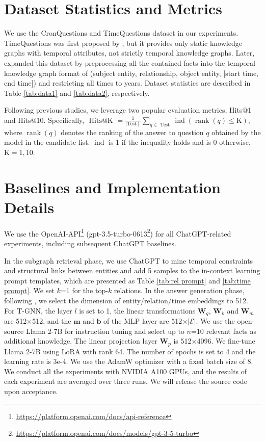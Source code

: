\documentclass[11pt]{article}
\begin{document}
\section{Dataset Statistics and Metrics}
\label{appendix:dataset}

We use the CronQuestions and TimeQuestions dataset in our experiments. TimeQuestions was first proposed by \citet{TimeQuestions}, but it provides only static knowledge graphs with temporal attributes, not strictly temporal knowledge graphs. Later, \citet{TwiRGCN} expanded this dataset by preprocessing all the contained facts into the temporal knowledge graph format of (subject entity, relationship, object entity, [start time, end time]) and restricting all times to years. Dataset statistics are described in Table \ref{tab:data1} and \ref{tab:data2}, respectively.

Following previous studies, we leverage two popular evaluation metrics, Hits@1 and Hits@10. Specifically, $\text { Hits@K }=\frac{1}{\mid \text {Test}\mid} \sum_{q \in \text { Test }}\operatorname{ind}(\operatorname{rank}(q) \leq \text{K})$, where $\operatorname{rank}(q)$ denotes the ranking of the answer to question $q$ obtained by the model in the candidate list. $\operatorname{ind}$ is 1 if the inequality holds and is 0 otherwise, $\text{K}=1,10$. 

\section{Baselines and Implementation Details}
\label{appendix:baseline}

We use the OpenAI-API\footnote{\url{https://platform.openai.com/docs/api-reference}} (gpt-3.5-turbo-0613\footnote{\url{https://platform.openai.com/docs/models/gpt-3-5-turbo}}) for all ChatGPT-related experiments, including subsequent ChatGPT baselines.

In the subgraph retrieval phase, we use ChatGPT to mine temporal constraints and structural links between entities and add 5 samples to the in-context learning prompt templates, which are presented as Table \ref{tab:rel prompt} and \ref{tab:time prompt}. 
We set $k$=1 for the top-$k$ relations. 
In the answer generation phase, following \cite{TNTComplEx}, we select the dimension of entity/relation/time embeddings to 512.  For T-GNN, the layer $l$ is set to 1, the linear transformations $\mathbf{W}_{q}$, $\mathbf{W}_{k}$ and $\mathbf{W}_{m}$ are 512×512, and the $\mathbf{m}$ and $\mathbf{b}$ of the MLP layer are 512×$|\mathcal{E}|$. 
We use the open-source Llama 2-7B \cite{Llama2} for instruction tuning and select up to $n$=10 relevant facts as additional knowledge. The linear projection layer $\mathbf{W}_{p}$ is 512×4096.
We fine-tune Llama 2-7B using LoRA \cite{lora} with rank 64. The number of epochs is set to 4 and the learning rate is 3e{-4}. We use the AdamW optimizer \cite{Adamw} with a fixed batch size of 8. We conduct all the experiments with NVIDIA A100 GPUs, and the results of each experiment are averaged over three runs.
We will release the source code upon acceptance.
\end{document}
